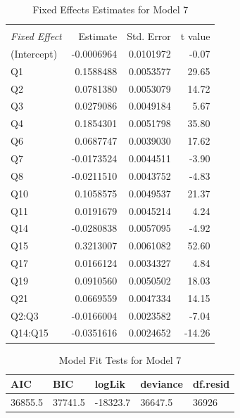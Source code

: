 \documentclass[11pt,a4paper]{report}
\begin{document}
\begin{table}
	\centering
	\caption{Fixed Effects Estimates for Model 7}
	\label{Table:FixedEffectsM7}
\begin{tabular}{@{\extracolsep{5pt}}lrrr}
	\hline \hline
	& & &  \\
	\textit{Fixed Effect}	&	Estimate	& Std. Error & t value \\[0.3cm]
	\hline
	(Intercept) & -0.0006964 & 0.0101972  & -0.07 \\[0.2cm]
	Q1          & 0.1588488  &0.0053577   &29.65\\[0.2cm]
	Q2          & 0.0781380  &0.0053079   &14.72\\[0.2cm]
	Q3          & 0.0279086  &0.0049184   & 5.67\\[0.2cm]
	Q4          & 0.1854301  &0.0051798   &35.80\\[0.2cm]
	Q6          & 0.0687747  &0.0039030   &17.62\\[0.2cm]
	Q7          &-0.0173524  &0.0044511   &-3.90\\[0.2cm]
	Q8          &-0.0211510  &0.0043752   &-4.83\\[0.2cm]
	Q10         & 0.1058575  &0.0049537   &21.37\\[0.2cm]
	Q11         & 0.0191679  &0.0045214   & 4.24\\[0.2cm]
	Q14         &-0.0280838  &0.0057095   &-4.92\\[0.2cm]
	Q15         & 0.3213007  &0.0061082   &52.60\\[0.2cm]
	Q17         & 0.0166124  &0.0034327   & 4.84\\[0.2cm]
	Q19         & 0.0910560  &0.0050502   &18.03\\[0.2cm]
	Q21         & 0.0669559  &0.0047334   &14.15\\[0.2cm]
	Q2:Q3       &-0.0166004  &0.0023582   &-7.04\\[0.2cm]
	Q14:Q15     &-0.0351616  &0.0024652   &-14.26\\[0.2cm]
	\hline \hline
\end{tabular}
\end{table}

\begin{table}
	\centering
	\caption{Model Fit Tests for Model 7}
	\begin{tabular}{@{\extracolsep{5pt}}lllll}
		\hline \hline
		AIC & BIC & logLik & deviance & df.resid \\[0.2cm]
		\hline
		36855.5 & 37741.5 & -18323.7 & 36647.5 & 36926 \\[0.2cm]
		\hline \hline
	\end{tabular}
\end{table}
\end{document}
